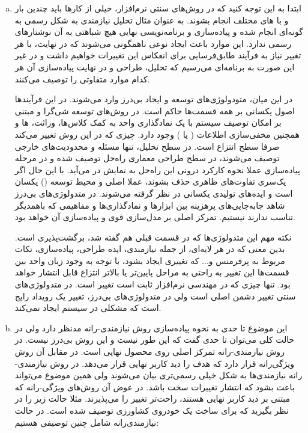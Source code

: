 {\begin{enumerate}[a)]
		\item 
		ابتدا به این توجه کنید که در روش‌های سنتی نرم‌افزار، خیلی از کارها باید چندین بار و با  های مختلف انجام بشوند. به عنوان مثال تحلیل نیازمندی به شکل رسمی به گونه‌ای انجام شده و پیاده‌سازی و برنامه‌نویسی نهایی هیچ شباهتی به آن نوشتارهای رسمی ندارد.  این موارد باعث ایجاد نوعی ناهمگونی می‌شوند که در نهایت، با هر تغییر نیاز به فرآیند طابق‌فرسایی برای انعکاس این تغییرات خواهیم داشت و در غیر این صورت به برنامه‌ای می‌رسیم که تحلیل، طراحی و در نهایت پیاده‌سازی آن هر کدام موارد متفاوتی را توصیف می‌کنند.
		
		در این میان، متودولوژی‌های توسعه و ایجاد بی‌درز وارد می‌شوند. در این فرآیند‌ها اصول یکسانی بر همه قسمت‌ها حاکم است. در روش‌های توسعه شی‌گرا و مبتنی بر  امکان توصیف سیستم با یک نمادگذاری واحد به کمک کلاس‌ها، وراثت،  ها و همچنین مخفی‌سازی اطلاعات ( یا ) وجود دارد. چیزی که در این روش تغییر می‌کند صرفا سطح انتزاع است. در سطح تحلیل، تنها مسئله و محدودیت‌های خارجی توصیف می‌شوند، در سطح طراحی معماری راه‌حل توصیف شده و در مرحله پیاده‌سازی عملا نحوه کارکرد درونی این راه‌حل به نمایش در می‌آید. با این حال اگر یک‌سری تفاوت‌های ظاهری حذف بشوند، عملا  اصلی و محیط توسعه () یکسان است و ایده‌های تولیدی یکسانی در نظر گرفته می‌شوند. در متدولوژی‌های بی‌درز شاهد جابه‌جایی‌های پرهزینه بین ابزارها و نمادگذاری‌ها و مفاهیمی که باهمدیگر تناسب ندارند نیستیم. تمرکز اصلی بر مدل‌سازی قوی و پیاده‌سازی آن خواهد بود.
		
		نکته مهم این متدولوژی‌ها که در قسمت‌ قبلی هم گفته شد، برگشت‌پذیری است. بدین معنی که در هر لایه‌ای، از جمله نیازمندی، ایده طراحی، پیاده‌سازی، نکات مربوط به پرفرمنس و... که تغییری ایجاد بشود، با توجه به وجود زبان واحد بین قسمت‌ها این تغییر به راحتی به مراحل پایین‌تر یا بالاتر انتزاع قابل انتشار خواهد بود. تنها چیزی که در مهندسی نرم‌افزار ثابت است تغییر است. در متدولوژی‌های سنتی تغییر دشمن اصلی است ولی در متدولوژی‌های بی‌درز، تغییر یک رویداد رایج است که مشکلی در سیستم ایجاد نمی‌کند.
		
		
	
		\item
این موضوع تا حدی به نحوه پیاده‌سازی روش نیازمندی-رانه مدنظر دارد ولی در حالت کلی می‌توان تا حدی گفت که این طور نیست و این روش بی‌درز نیست. در روش نیازمندی-رانه تمرکز اصلی روی محصول نهایی است. در مقابل آن روش ویژگی‌رانه قرار دارد که هدف را دید کاربر نهایی قرار می‌دهد. در روش نیازمندی-رانه نیازمندی‌ها به شکل خیلی رسمی‌تری بیان می‌شوند ولی همین موضوع می‌تواند باعث بشود که انتشار تغییرات سخت باشد. در عوض آن روش‌های ویژگی-رانه که مبتنی بر دید کاربر نهایی هستند، راحت‌تر تغییر را می‌پذیرند. مثلا حالت زیر را در نظر بگیرید که برای ساخت یک خودروی کشاورزی توصیف شده است. در حالت نیازمندی‌رانه شامل چنین توصیفی هستیم:


\end{enumerate}}
